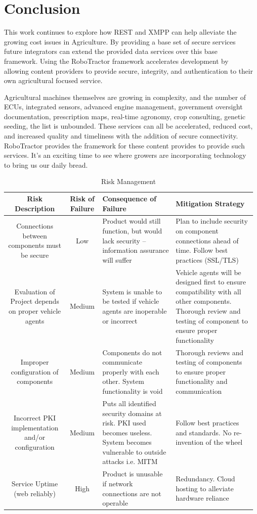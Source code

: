\documentclass[conference,12pt]{IEEEtran}
\begin{document}
\section{Conclusion}
This work continues to explore how REST and XMPP can help alleviate the growing
cost issues in Agriculture. By providing a base set of secure services future
integrators can extend the provided data services over this base framework.
Using the RoboTractor framework accelerates development by allowing content
providers to provide secure, integrity, and authentication to their own
agricultural focused service. 

Agricultural machines themselves are growing in complexity, and the number of ECUs,
integrated sensors, advanced engine management, government oversight
documentation, prescription maps, real-time agronomy, crop consulting, genetic
seeding, the list is unbounded. These services can all be accelerated, reduced
cost, and increased quality and timeliness with the addition of secure
connectivity. RoboTractor provides the framework for these content provides to
provide such services. It's an exciting time to see where growers are
incorporating technology to bring us our daily bread.


\printbibliography
\clearpage
\begin{landscape}
\begin{table}%
\caption{Risk Management}
\label{tab:riskmanagement}
\centering
\begin{tabular}{c||c||p{2in}||p{2in}}
\hline
\bfseries Risk Description & \bfseries Risk of Failure & \bfseries Consequence of Failure & \bfseries Mitigation Strategy\\
\hline\hline
Connections between components must be secure
& Low
& Product would still function, but would lack security – information assurance will suffer
& Plan to include security on component connections ahead of time. Follow best practices (SSL/TLS)\\
\hline
Evaluation of Project depends on proper vehicle agents
& Medium
& System is unable to be tested if vehicle agents are inoperable or incorrect
& Vehicle agents will be designed first to ensure compatibility with all other components. Thorough review and testing of component to ensure proper functionality\\
\hline
Improper configuration of components
& Medium
& Components do not communicate properly with each other. System functionality is void
& Thorough reviews and testing of components to ensure proper functionality and communication\\
\hline
Incorrect PKI implementation and/or configuration
& Medium
& Puts all identified security domains at risk. PKI used becomes useless. System becomes vulnerable to outside attacks i.e. MITM
& Follow best practices and standards. No re-invention of the wheel\\
\hline
Service Uptime (web reliably)
& High
& Product is unusable if network connections are not operable
& Redundancy. Cloud hosting to alleviate hardware reliance\\
\hline
\end{tabular}
\end{table}
\end{landscape}
\end{document}
